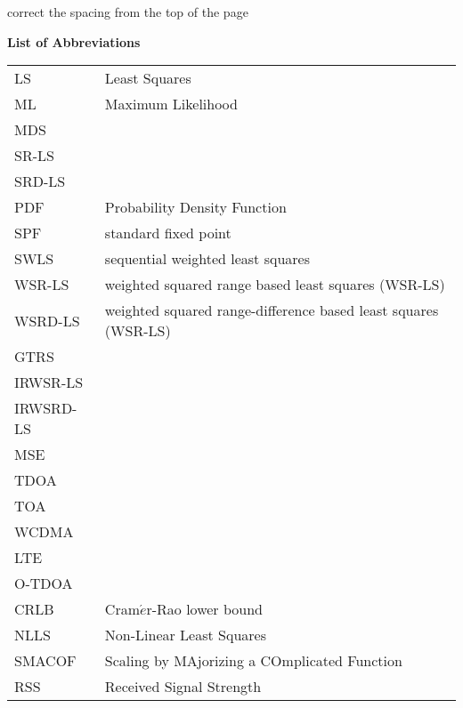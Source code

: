 \newpage
{}

\phantom{m}

correct the spacing from the top of the page

\begin{flushleft}
\begin{Huge}
\textbf{List of Abbreviations}
\end{Huge}
\end{flushleft}

\begin{table}[h]
\begin{tabular}{l l} 
LS & Least Squares \\
ML & Maximum Likelihood \\
MDS &  \\
SR-LS  & \\
SRD-LS & \\
PDF & Probability Density Function \\
SPF & standard fixed point\\
SWLS & sequential weighted least squares \\
WSR-LS & weighted squared range based least squares (WSR-LS)\\
WSRD-LS & weighted squared range-difference based least squares (WSR-LS)\\
GTRS & \\
IRWSR-LS & \\
IRWSRD-LS & \\
MSE & \\
TDOA & \\
TOA & \\
WCDMA & \\
LTE & \\
O-TDOA & \\
CRLB & Cram$\acute{e}$r-Rao  lower  bound \\
NLLS & Non-Linear Least Squares \\
SMACOF & Scaling by MAjorizing a COmplicated Function \\
RSS & Received Signal Strength \\
\end{tabular}
\end{table}
